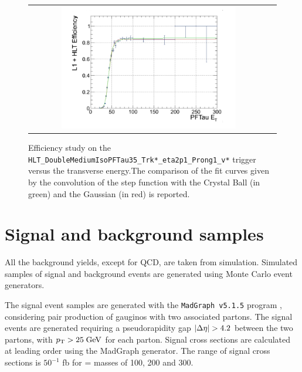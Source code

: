  	\begin{figure}[tbh!]
	\centering
	\begin{tabular}{cc}
		\includegraphics[width=0.75\textwidth]{analysis/pics/trigger_turnon.png}
	\end{tabular}
	\caption{Efficiency study on the \texttt{HLT\_\-DoubleMedium\-IsoPFTau35\_\-Trk*\_\-eta2p1\_\-Prong1\_\-v*} trigger versus the \hadtau transverse energy.The comparison of the fit curves given by the convolution of the step function with the Crystal Ball (in green) and the Gaussian (in red) is reported\cite{bib:dthesis:riccardoManzoni}.}
	\label{fig::trigger_turnon}
\end{figure}

\section{Signal and background samples}



All the background yields, except for QCD, are taken from simulation. Simulated samples of signal and background events are generated using Monte Carlo event generators.

The signal event samples are generated with the \texttt{MadGraph v5.1.5} program \cite{Alwall:2011uj}, considering pair production of gauginos with two associated partons. The signal events are generated requiring a pseudorapidity gap $|\Delta\eta| > 4.2$ between the two partons, with $p_{\text{T}} > 25\;\text{Ge}\kern-0.06667em\text{V}$ for each parton. Signal cross sections are calculated at leading order using the MadGraph generator. The range of signal cross sections is $50^{-1}$ fb for \charginopm = \neutralinotwo masses of 100, 200 and 300\gev.

